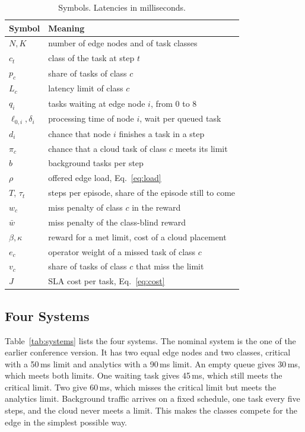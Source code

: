 \begin{table}[t]
\caption{Symbols. Latencies in milliseconds.}
\label{tab:symbols}
\centering
\footnotesize
\setlength{\tabcolsep}{3pt}
\begin{tabular}{@{}l>{\raggedright\arraybackslash}p{6.2cm}@{}}
\toprule
Symbol & Meaning \\
\midrule
$N, K$ & number of edge nodes and of task classes \\
$c_t$ & class of the task at step $t$ \\
$p_c$ & share of tasks of class $c$ \\
$L_c$ & latency limit of class $c$ \\
$q_i$ & tasks waiting at edge node $i$, from 0 to 8 \\
$\ell_{0,i}, \delta_i$ & processing time of node $i$, wait per queued task \\
$d_i$ & chance that node $i$ finishes a task in a step \\
$\pi_c$ & chance that a cloud task of class $c$ meets its limit \\
$b$ & background tasks per step \\
$\rho$ & offered edge load, Eq.~\eqref{eq:load} \\
$T$, $\tau_t$ & steps per episode, share of the episode still to come \\
$w_c$ & miss penalty of class $c$ in the reward \\
$\bar w$ & miss penalty of the class-blind reward \\
$\beta, \kappa$ & reward for a met limit, cost of a cloud placement \\
$e_c$ & operator weight of a missed task of class $c$ \\
$v_c$ & share of tasks of class $c$ that miss the limit \\
$J$ & SLA cost per task, Eq.~\eqref{eq:cost} \\
\bottomrule
\end{tabular}
\end{table}

\subsection{Four Systems}
Table~\ref{tab:systems} lists the four systems. The nominal system is the one of the earlier conference version. It has two equal edge nodes and two classes, critical with a 50\,ms limit and analytics with a 90\,ms limit. An empty queue gives 30\,ms, which meets both limits. One waiting task gives 45\,ms, which still meets the critical limit. Two give 60\,ms, which misses the critical limit but meets the analytics limit. Background traffic arrives on a fixed schedule, one task every five steps, and the cloud never meets a limit. This makes the classes compete for the edge in the simplest possible way.

